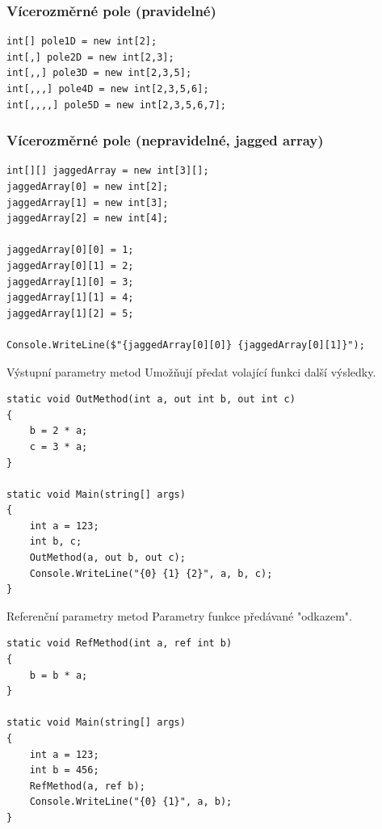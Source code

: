 \begin{frame}[fragile]
\frametitle{Vícerozměrné pole (pravidelné)}
\begin{yesblock}
\begin{lstlisting}
int[] pole1D = new int[2];
int[,] pole2D = new int[2,3];
int[,,] pole3D = new int[2,3,5];
int[,,,] pole4D = new int[2,3,5,6];
int[,,,,] pole5D = new int[2,3,5,6,7];
\end{lstlisting}
\end{yesblock}
\end{frame}



\begin{frame}[fragile]
\frametitle{Vícerozměrné pole (nepravidelné, jagged array)}
\begin{yesblock}
\begin{lstlisting}
int[][] jaggedArray = new int[3][];
jaggedArray[0] = new int[2];
jaggedArray[1] = new int[3];
jaggedArray[2] = new int[4];

jaggedArray[0][0] = 1;
jaggedArray[0][1] = 2;
jaggedArray[1][0] = 3;
jaggedArray[1][1] = 4;
jaggedArray[1][2] = 5;

Console.WriteLine($"{jaggedArray[0][0]} {jaggedArray[0][1]}");
\end{lstlisting}
\end{yesblock}
\end{frame}







\begin{frame}[fragile]
\vfill
\begin{block}{Výstupní parametry metod}
Umožňují předat volající funkci další výsledky.
\end{block}
\vfill
\begin{yesblock}
\begin{lstlisting}
static void OutMethod(int a, out int b, out int c)
{
    b = 2 * a;
    c = 3 * a;
}

static void Main(string[] args)
{
    int a = 123;
    int b, c;
    OutMethod(a, out b, out c);
    Console.WriteLine("{0} {1} {2}", a, b, c);
}
\end{lstlisting}
\end{yesblock}
\vfill
\end{frame}


\begin{frame}[fragile]
\vfill
\begin{block}{Referenční parametry metod}
Parametry funkce předávané "odkazem".
\end{block}
\vfill
\begin{yesblock}
\begin{lstlisting}
static void RefMethod(int a, ref int b)
{
    b = b * a;
}

static void Main(string[] args)
{
    int a = 123;
    int b = 456;
    RefMethod(a, ref b);
    Console.WriteLine("{0} {1}", a, b);
}
\end{lstlisting}
\end{yesblock}
\vfill
\end{frame}



